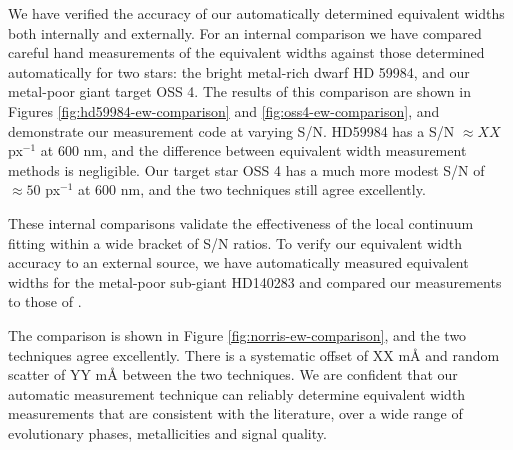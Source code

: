 \documentclass{emulateapj}
\begin{document}
We have verified the accuracy of our automatically determined equivalent widths both internally and externally. For an internal comparison we have compared careful hand measurements of the equivalent widths against those determined automatically for two stars: the bright metal-rich dwarf HD 59984, and our metal-poor giant target OSS 4. The results of this comparison are shown in Figures \ref{fig:hd59984-ew-comparison} and \ref{fig:oss4-ew-comparison}, and demonstrate our measurement code at varying S/N. HD59984 has a S/N $\approx XX$ px$^{-1}$ at 600 nm, and the difference between equivalent width measurement methods is negligible. Our target star OSS 4 has a much more modest S/N of $\approx50$ px$^{-1}$ at 600 nm, and the two techniques still agree excellently.

These internal comparisons validate the effectiveness of the local continuum fitting within a wide bracket of S/N ratios. To verify our equivalent width accuracy to an external source, we have automatically measured equivalent widths for the metal-poor sub-giant HD140283 and compared our measurements to those of \citet{Norris;et-al_1996}. 

The comparison is shown in Figure \ref{fig:norris-ew-comparison}, and the two techniques agree excellently. There is a systematic offset of XX m\AA{} and random scatter of YY m\AA{} between the two techniques. We are confident that our automatic measurement technique can reliably determine equivalent width measurements that are consistent with the literature, over a wide range of evolutionary phases, metallicities and signal quality.




\newpage
\end{document}
